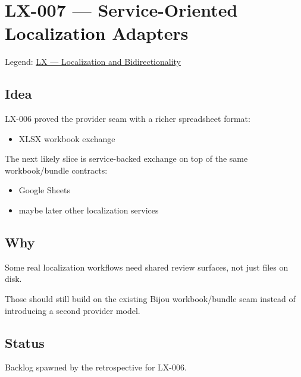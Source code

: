 \chapter{LX-007 --- Service-Oriented Localization Adapters}\label{record-355}

\smallskip

Legend: \href{https://github.com/flyingrobots/bijou/blob/cbd70612140e7a450d764b3c7be1c6af878b99bc/docs/method/graveyard/legends/LX-localization-and-bidirectionality.md}{LX --- Localization and Bidirectionality}

\section{Idea}\label{record-355-idea}

LX-006 proved the provider seam with a richer spreadsheet format:

\begin{itemize}
\tightlist
\item
  XLSX workbook exchange
\end{itemize}

The next likely slice is service-backed exchange on top of the same workbook/bundle contracts:

\begin{itemize}
\tightlist
\item
  Google Sheets
\item
  maybe later other localization services
\end{itemize}

\section{Why}\label{record-355-why}

Some real localization workflows need shared review surfaces, not just files on disk.

Those should still build on the existing Bijou workbook/bundle seam instead of introducing a second provider model.

\section{Status}\label{record-355-status}

Backlog spawned by the retrospective for LX-006.


